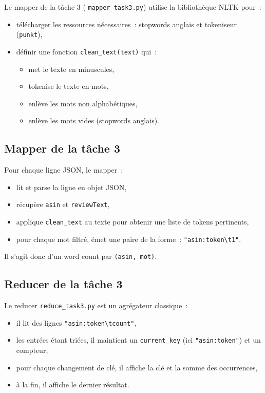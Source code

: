\documentclass[a4paper,11pt]{article}
\begin{document}
Le mapper de la tâche 3 (
\texttt{mapper\_task3.py}) utilise la bibliothèque NLTK pour~:
\begin{itemize}
  \item télécharger les ressources nécessaires~: stopwords anglais
        et tokeniseur (\texttt{punkt}),\
  \item définir une fonction \texttt{clean\_text(text)} qui~:
        \begin{itemize}
          \item met le texte en minuscules,\
          \item tokenise le texte en mots,\
          \item enlève les mots non alphabétiques,\
          \item enlève les mots vides (stopwords anglais).
        \end{itemize}
\end{itemize}

\subsection{Mapper de la tâche 3}

Pour chaque ligne JSON, le mapper~:
\begin{itemize}
  \item lit et parse la ligne en objet JSON,\
  \item récupère \texttt{asin} et \texttt{reviewText},\
  \item applique \texttt{clean\_text} au texte pour obtenir une
        liste de tokens pertinents,\
  \item pour chaque mot filtré, émet une paire de la forme~:
        \texttt{"asin:token\textbackslash t1"}.
\end{itemize}

Il s'agit donc d'un word count par \texttt{(asin, mot)}.

\subsection{Reducer de la tâche 3}

Le reducer \texttt{reduce\_task3.py} est un agrégateur classique~:
\begin{itemize}
  \item il lit des lignes \texttt{"asin:token\textbackslash tcount"},\
  \item les entrées étant triées, il maintient un \texttt{current\_key}
        (ici \texttt{"asin:token"}) et un compteur,\
  \item pour chaque changement de clé, il affiche la clé et la somme
        des occurrences,\
  \item à la fin, il affiche le dernier résultat.
\end{itemize}
\end{document}
